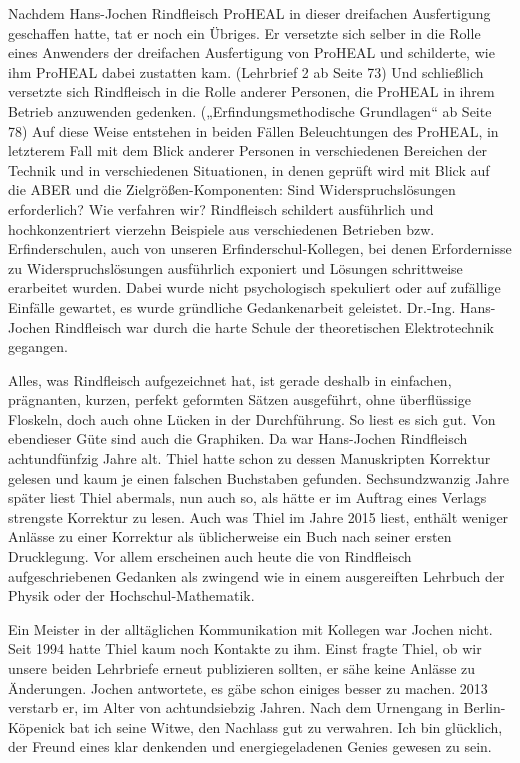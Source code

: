 \documentclass[11pt,a4paper]{article}
\begin{document}
Nachdem Hans-Jochen Rindfleisch ProHEAL in dieser dreifachen Ausfertigung
geschaffen hatte, tat er noch ein Übriges. Er versetzte sich selber in die
Rolle eines Anwenders der dreifachen Ausfertigung von ProHEAL und schilderte,
wie ihm ProHEAL dabei zustatten kam. (Lehrbrief 2 ab Seite 73) Und schließlich
versetzte sich Rindfleisch in die Rolle anderer Personen, die ProHEAL in ihrem
Betrieb anzuwenden gedenken. („Erfindungsmethodische Grundlagen“ ab Seite 78)
Auf diese Weise entstehen in beiden Fällen Beleuchtungen des ProHEAL, in
letzterem Fall mit dem Blick anderer Personen in verschiedenen Bereichen der
Technik und in verschiedenen Situationen, in denen geprüft wird mit Blick auf
die ABER und die Zielgrößen-Komponenten: Sind Widerspruchslösungen
erforderlich? Wie verfahren wir? Rindfleisch schildert ausführlich und
hochkonzentriert vierzehn Beispiele aus verschiedenen Betrieben bzw.
Erfinderschulen, auch von unseren Erfinderschul-Kollegen, bei denen
Erfordernisse zu Widerspruchslösungen ausführlich exponiert und Lösungen
schrittweise erarbeitet wurden. Dabei wurde nicht psychologisch spekuliert oder
auf zufällige Einfälle gewartet, es wurde gründliche Gedankenarbeit geleistet.
Dr.-Ing. Hans-Jochen Rindfleisch war durch die harte Schule der theoretischen
Elektrotechnik gegangen.

Alles, was Rindfleisch aufgezeichnet hat, ist gerade deshalb in einfachen,
prägnanten, kurzen, perfekt geformten Sätzen ausgeführt, ohne überflüssige
Floskeln, doch auch ohne Lücken in der Durchführung. So liest es sich gut. Von
ebendieser Güte sind auch die Graphiken. Da war Hans-Jochen Rindfleisch
achtundfünfzig Jahre alt. Thiel hatte schon zu dessen Manuskripten Korrektur
gelesen und kaum je einen falschen Buchstaben gefunden. Sechsundzwanzig Jahre
später liest Thiel abermals, nun auch so, als hätte er im Auftrag eines Verlags
strengste Korrektur zu lesen. Auch was Thiel im Jahre 2015 liest, enthält
weniger Anlässe zu einer Korrektur als üblicherweise ein Buch nach seiner
ersten Drucklegung. Vor allem erscheinen auch heute die von Rindfleisch
aufgeschriebenen Gedanken als zwingend wie in einem ausgereiften Lehrbuch der
Physik oder der Hochschul-Mathematik.

Ein Meister in der alltäglichen Kommunikation mit Kollegen war Jochen nicht.
Seit 1994 hatte Thiel kaum noch Kontakte zu ihm. Einst fragte Thiel, ob wir
unsere beiden Lehrbriefe erneut publizieren sollten, er sähe keine Anlässe zu
Änderungen. Jochen antwortete, es gäbe schon einiges besser zu machen. 2013
verstarb er, im Alter von achtundsiebzig Jahren. Nach dem Urnengang in
Berlin-Köpenick bat ich seine Witwe, den Nachlass gut zu verwahren. Ich bin
glücklich, der Freund eines klar denkenden und energiegeladenen Genies gewesen
zu sein.
\end{document}
